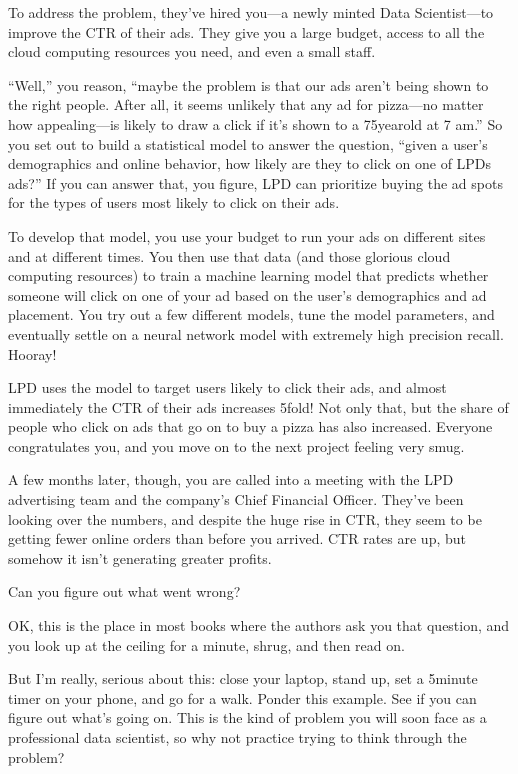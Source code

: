 \documentclass[letterpaper,10pt,english]{jupyterBook}
\begin{document}
\sphinxAtStartPar
To address the problem, they’ve hired you—a newly minted Data Scientist—to improve the CTR of their ads. They give you a large budget, access to all the cloud computing resources you need, and even a small staff.

\sphinxAtStartPar
“Well,” you reason, “maybe the problem is that our ads aren’t being shown to the right people. After all, it seems unlikely that any ad for pizza—no matter how appealing—is likely to draw a click if it’s shown to a 75\sphinxhyphen{}year\sphinxhyphen{}old at 7 am.” So you set out to build a statistical model to answer the question, “given a user’s demographics and online behavior, how likely are they to click on one of LPDs ads?” If you can answer that, you figure, LPD can prioritize buying the ad spots for the types of users most likely to click on their ads.

\sphinxAtStartPar
To develop that model, you use your budget to run your ads on different sites and at different times. You then use that data (and those glorious cloud computing resources) to train a machine learning model that predicts whether someone will click on one of your ad based on the user’s demographics and ad placement. You try out a few different models, tune the model parameters, and eventually settle on a neural network model with extremely high precision  recall. Hooray!

\sphinxAtStartPar
LPD uses the model to target users likely to click their ads, and almost immediately the CTR of their ads increases 5\sphinxhyphen{}fold! Not only that, but the share of people who click on ads that go on to buy a pizza has also increased. Everyone congratulates you, and you move on to the next project feeling very smug.

\sphinxAtStartPar
A few months later, though, you are called into a meeting with the LPD advertising team and the company’s Chief Financial Officer. They’ve been looking over the numbers, and despite the huge rise in CTR, they seem to be getting fewer online orders than before you arrived. CTR rates are up, but somehow it isn’t generating greater profits.

\sphinxAtStartPar
Can you figure out what went wrong?

\sphinxAtStartPar
OK, this is the place in most books where the authors ask you that question, and you look up at the ceiling for a minute, shrug, and then read on.

\sphinxAtStartPar
But I’m really,  serious about this: close your laptop, stand up, set a 5\sphinxhyphen{}minute timer on your phone, and go for a walk. Ponder this example. See if you can figure out what’s going on. This is  the kind of problem you will soon face as a professional data scientist, so why not practice trying to think through the problem?
\end{document}
